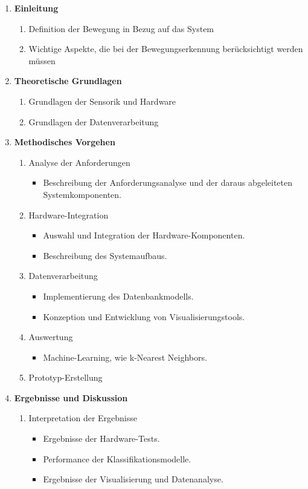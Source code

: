 \documentclass{scrartcl}
\begin{document}
\begin{enumerate}
	\item \textbf{Einleitung}
	\begin{enumerate}
        \item Definition der Bewegung in Bezug auf das System
         \item Wichtige Aspekte, die bei der Bewegungserkennung berücksichtigt werden müssen
	\end{enumerate}
	
	\item \textbf{Theoretische Grundlagen}
	\begin{enumerate}
		\item Grundlagen der Sensorik und Hardware
		\item Grundlagen der Datenverarbeitung
	\end{enumerate}
	
	\item \textbf{Methodisches Vorgehen}
	\begin{enumerate}
		\item Analyse der Anforderungen
		\begin{itemize}
			\item Beschreibung der Anforderungsanalyse und der daraus abgeleiteten Systemkomponenten.
		\end{itemize}
		\item Hardware-Integration
		\begin{itemize}
			\item Auswahl und Integration der Hardware-Komponenten.
			\item Beschreibung des Systemaufbaus.
		\end{itemize}
		\item Datenverarbeitung
		\begin{itemize}
			\item Implementierung des Datenbankmodells.
			\item Konzeption und Entwicklung von Visualisierungstools.
		\end{itemize}
		\item Auswertung
		\begin{itemize}
			\item Machine-Learning, wie k-Nearest Neighbors.
		\end{itemize}
		\item Prototyp-Erstellung
	\end{enumerate}
	
	\item \textbf{Ergebnisse und Diskussion}
	\begin{enumerate}
		\item Interpretation der Ergebnisse
		\begin{itemize}
			\item Ergebnisse der Hardware-Tests.
			\item Performance der Klassifikationsmodelle.
			\item Ergebnisse der Visualisierung und Datenanalyse.
		\end{itemize}
	\end{enumerate}
	

\end{enumerate}
\end{document}
